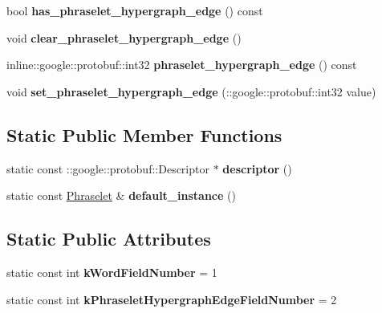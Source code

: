 \begin{DoxyCompactItemize}
\item 
\hypertarget{classlattice_1_1Phraselet_a9a6afc2d0f7466317b7bbd0ebe8eb5d4}{
bool {\bfseries has\_\-phraselet\_\-hypergraph\_\-edge} () const }
\label{classlattice_1_1Phraselet_a9a6afc2d0f7466317b7bbd0ebe8eb5d4}

\item 
\hypertarget{classlattice_1_1Phraselet_a4c9f2577858563c51a8531604e30b1a7}{
void {\bfseries clear\_\-phraselet\_\-hypergraph\_\-edge} ()}
\label{classlattice_1_1Phraselet_a4c9f2577858563c51a8531604e30b1a7}

\item 
\hypertarget{classlattice_1_1Phraselet_a36ecf9680559a4cfdb011c8531830220}{
inline::google::protobuf::int32 {\bfseries phraselet\_\-hypergraph\_\-edge} () const }
\label{classlattice_1_1Phraselet_a36ecf9680559a4cfdb011c8531830220}

\item 
\hypertarget{classlattice_1_1Phraselet_ae9112854c9a8406aeef40c13f9c8b02a}{
void {\bfseries set\_\-phraselet\_\-hypergraph\_\-edge} (::google::protobuf::int32 value)}
\label{classlattice_1_1Phraselet_ae9112854c9a8406aeef40c13f9c8b02a}

\end{DoxyCompactItemize}
\subsection*{Static Public Member Functions}
\begin{DoxyCompactItemize}
\item 
\hypertarget{classlattice_1_1Phraselet_a8b9fdd34efe3ebab08aba8b6b2dfc927}{
static const ::google::protobuf::Descriptor $\ast$ {\bfseries descriptor} ()}
\label{classlattice_1_1Phraselet_a8b9fdd34efe3ebab08aba8b6b2dfc927}

\item 
\hypertarget{classlattice_1_1Phraselet_a64a4092d90a733f714a7d0371b4faa24}{
static const \hyperlink{classlattice_1_1Phraselet}{Phraselet} \& {\bfseries default\_\-instance} ()}
\label{classlattice_1_1Phraselet_a64a4092d90a733f714a7d0371b4faa24}

\end{DoxyCompactItemize}
\subsection*{Static Public Attributes}
\begin{DoxyCompactItemize}
\item 
\hypertarget{classlattice_1_1Phraselet_abc30d76e181d14e5a53cee96bdd50eda}{
static const int {\bfseries kWordFieldNumber} = 1}
\label{classlattice_1_1Phraselet_abc30d76e181d14e5a53cee96bdd50eda}

\item 
\hypertarget{classlattice_1_1Phraselet_a99ae4ed782afdeef679118bef7361c00}{
static const int {\bfseries kPhraseletHypergraphEdgeFieldNumber} = 2}
\label{classlattice_1_1Phraselet_a99ae4ed782afdeef679118bef7361c00}

\end{DoxyCompactItemize}
